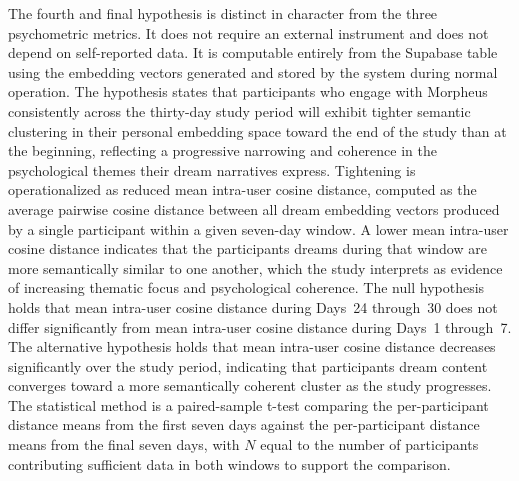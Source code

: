 \documentclass[12pt,a4paper]{report}
\DeclareRobustCommand{\code}[1]{\texttt{\detokenize{#1}}}
\begin{document}
The fourth and final hypothesis is distinct in character from the three psychometric metrics. It does not require an external instrument and does not depend on self-reported data. It is computable entirely from the Supabase \code{dreams} table using the embedding vectors generated and stored by the system during normal operation. The hypothesis states that participants who engage with Morpheus consistently across the thirty-day study period will exhibit tighter semantic clustering in their personal embedding space toward the end of the study than at the beginning, reflecting a progressive narrowing and coherence in the psychological themes their dream narratives express. Tightening is operationalized as reduced mean intra-user cosine distance, computed as the average pairwise cosine distance between all dream embedding vectors produced by a single participant within a given seven-day window. A lower mean intra-user cosine distance indicates that the participant\textquotesingle{}s dreams during that window are more semantically similar to one another, which the study interprets as evidence of increasing thematic focus and psychological coherence. The null hypothesis holds that mean intra-user cosine distance during Days~\num{24} through~\num{30} does not differ significantly from mean intra-user cosine distance during Days~\num{1} through~\num{7}. The alternative hypothesis holds that mean intra-user cosine distance decreases significantly over the study period, indicating that participants\textquotesingle{} dream content converges toward a more semantically coherent cluster as the study progresses. The statistical method is a paired-sample t-test comparing the per-participant distance means from the first seven days against the per-participant distance means from the final seven days, with $N$ equal to the number of participants contributing sufficient data in both windows to support the comparison.
\end{document}
